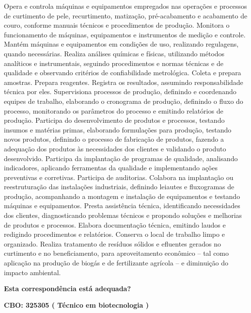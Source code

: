 \documentclass[
]{article}
\begin{document}
Opera e controla máquinas e equipamentos empregados nas operações e
processos de curtimento de pele, recurtimento, matização, pré-acabamento
e acabamento de couro, conforme manuais técnicos e procedimentos de
produção. Monitora o funcionamento de máquinas, equipamentos e
instrumentos de medição e controle. Mantém máquinas e equipamentos em
condições de uso, realizando regulagens, quando necessárias. Realiza
análises químicas e físicas, utilizando métodos analíticos e
instrumentais, seguindo procedimentos e normas técnicas e de qualidade e
observando critérios de confiabilidade metrológica. Coleta e prepara
amostras. Prepara reagentes. Registra os resultados, assumindo
responsabilidade técnica por eles. Supervisiona processos de produção,
definindo e coordenando equipes de trabalho, elaborando o cronograma de
produção, definindo o fluxo do processo, monitorando os parâmetros do
processo e emitindo relatórios de produção. Participa do desenvolvimento
de produtos e processos, testando insumos e matérias primas, elaborando
formulações para produção, testando novos produtos, definindo o processo
de fabricação de produtos, fazendo a adequação dos produtos às
necessidades dos clientes e validando o produto desenvolvido. Participa
da implantação de programas de qualidade, analisando indicadores,
aplicando ferramentas da qualidade e implementando ações preventivas e
corretivas. Participa de auditorias. Colabora na implantação ou
reestruturação das instalações industriais, definindo leiautes e
fluxogramas de produção, acompanhando a montagem e instalação de
equipamentos e testando máquinas e equipamentos. Presta assistência
técnica, identificando necessidades dos clientes, diagnosticando
problemas técnicos e propondo soluções e melhorias de produtos e
processos. Elabora documentação técnica, emitindo laudos e redigindo
procedimentos e relatórios. Conserva o local de trabalho limpo e
organizado. Realiza tratamento de resíduos sólidos e efluentes gerados
no curtimento e no beneficiamento, para aproveitamento econômico -- tal
como aplicação na produção de biogás e de fertilizante agrícola -- e
diminuição do impacto ambiental.

\begin{Form}
\textbf{Esta correspondência está adequada?} \\ 
\end{Form}

\textbf{CBO: 325305  ( Técnico em biotecnologia )}
\end{document}
